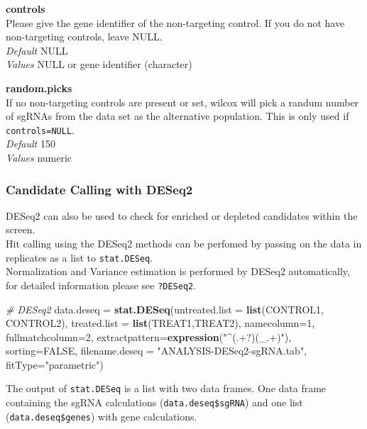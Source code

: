 \documentclass[]{article}
\newenvironment{Shaded}{\begin{snugshade}}{\end{snugshade}}
\newcommand{\KeywordTok}[1]{\textcolor[rgb]{0.13,0.29,0.53}{\textbf{{#1}}}}
\newcommand{\DataTypeTok}[1]{\textcolor[rgb]{0.13,0.29,0.53}{{#1}}}
\newcommand{\DecValTok}[1]{\textcolor[rgb]{0.00,0.00,0.81}{{#1}}}
\newcommand{\StringTok}[1]{\textcolor[rgb]{0.31,0.60,0.02}{{#1}}}
\newcommand{\CommentTok}[1]{\textcolor[rgb]{0.56,0.35,0.01}{\textit{{#1}}}}
\newcommand{\OtherTok}[1]{\textcolor[rgb]{0.56,0.35,0.01}{{#1}}}
\newcommand{\NormalTok}[1]{{#1}}
\begin{document}
\textbf{controls}\\
Please give the gene identifier of the non-targeting control. If you do
not have non-targeting controls, leave NULL.\\
\emph{Default} NULL\\
\emph{Values} NULL or gene identifier (character)

\textbf{random.picks}\\
If no non-targeting controls are present or set, wilcox will pick a
randum number of sgRNAs from the data set as the alternative population.
This is only used if \texttt{controls=NULL}.\\
\emph{Default} 150\\
\emph{Values} numeric

\subsubsection{Candidate Calling with
DESeq2}\label{candidate-calling-with-deseq2}

DESeq2 can also be used to check for enriched or depleted candidates
within the screen.\\
Hit calling using the DESeq2 methods can be perfomed by passing on the
data in replicates as a list to \texttt{stat.DESeq}.\\
Normalization and Variance estimation is performed by DESeq2
automatically, for detailed information please see \texttt{?DESeq2}.

\begin{Shaded}
\begin{Highlighting}[]
\CommentTok{# DESeq2}
\NormalTok{data.deseq =}\StringTok{ }\KeywordTok{stat.DESeq}\NormalTok{(}\DataTypeTok{untreated.list =} \KeywordTok{list}\NormalTok{(CONTROL1, CONTROL2),}
  \DataTypeTok{treated.list =} \KeywordTok{list}\NormalTok{(TREAT1,TREAT2), }\DataTypeTok{namecolumn=}\DecValTok{1}\NormalTok{,}
  \DataTypeTok{fullmatchcolumn=}\DecValTok{2}\NormalTok{, }\DataTypeTok{extractpattern=}\KeywordTok{expression}\NormalTok{(}\StringTok{"^(.+?)(_.+)"}\NormalTok{),}
  \DataTypeTok{sorting=}\OtherTok{FALSE}\NormalTok{, }\DataTypeTok{filename.deseq =} \StringTok{"ANALYSIS-DESeq2-sgRNA.tab"}\NormalTok{,}
  \DataTypeTok{fitType=}\StringTok{"parametric"}\NormalTok{)}
\end{Highlighting}
\end{Shaded}

The output of \texttt{stat.DESeq} is a list with two data frames. One
data frame containing the sgRNA calculations
(\texttt{data.deseq\$sgRNA}) and one list (\texttt{data.deseq\$genes})
with gene calculations.
\end{document}
